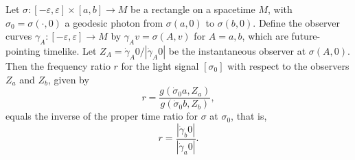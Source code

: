 Let $\sigma: [-\varepsilon, \varepsilon] \times [a, b] \to M$ be a rectangle on a spacetime $M$, with $\sigma_0 = \sigma(\cdot, 0)$ a geodesic photon from $\sigma(a, 0)$ to $\sigma(b, 0)$. Define the observer curves $\gamma_A: [-\varepsilon, \varepsilon] \to M$ by $\gamma_A v = \sigma(A, v)$ for $A = a, b$, which are future-pointing timelike. Let $Z_A = \dot{\gamma}_A 0 / |\dot{\gamma}_A 0|$ be the instantaneous observer at $\sigma(A, 0)$. Then the frequency ratio $r$ for the light signal $[\sigma_0]$ with respect to the observers $Z_a$ and $Z_b$, given by
$$
r = \frac{g(\dot{\sigma}_0 a, Z_a)}{g(\dot{\sigma}_0 b, Z_b)},
$$
equals the inverse of the proper time ratio for $\sigma$ at $\sigma_0$, that is,
$$
r = \frac{|\dot{\gamma}_b 0|}{|\dot{\gamma}_a 0|}.
$$
